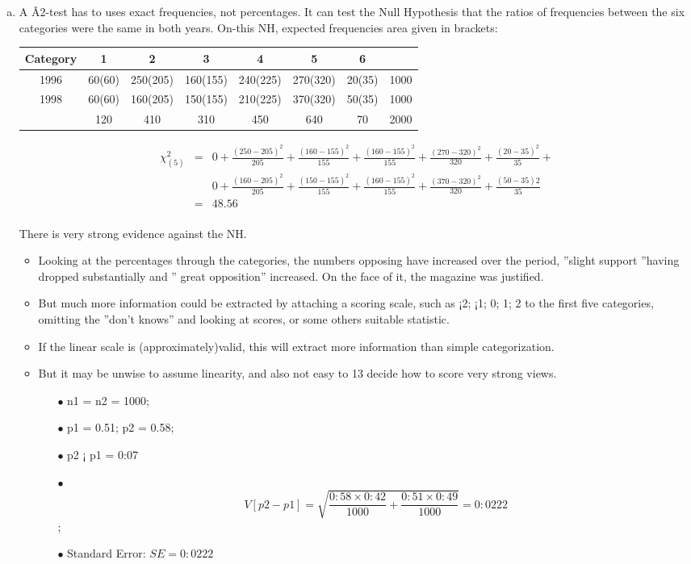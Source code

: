 \documentclass[a4paper,12pt]{article}
\begin{document}
\begin{enumerate}[(a)]
\item A Â2-test has to uses exact frequencies, not percentages. It can test the Null Hypothesis
that the ratios of frequencies between the six categories were the same in both years. On-this
NH, expected frequencies area given in brackets:

\begin{center}
\begin{tabular}{|c|c|c|c|c|c|c|c}
Category & 1 & 2 & 3 & 4 & 5 & 6 \\ \hline 
1996 & 60(60) & 250(205)  &160(155)& 240(225) & 270(320)& 20(35)& 1000\\ \hline
1998 & 60(60) & 160(205) & 150(155) & 210(225) & 370(320)&  50(35) & 1000\\ \hline
& 120&  410 & 310&  450&  640 & 70&  2000\\ \hline
\end{tabular}
\end{center}

\begin{eqnarray*}
\chi^2_{(5)} &=& 0 +  \frac{(250-205)^2}{205}  + \frac{(160-155)^2}{155} + \frac{(160-155)^2}{155}  +\frac{(270-320)^2}{320} + \frac{(20-35)^2}{35} + \\
& & 0 + \frac{(160-205)^2}{205} + \frac{(150-155)^2}{155}  + \frac{(160-155)^2}{155}+  \frac{(370-320)^2}{320} +
 \frac{(50-35)2}{35} \\
&=& 48.56\\
\end{eqnarray*}

There is very strong evidence against the NH.

\begin{itemize}
\item Looking at the percentages through the categories, the numbers opposing have increased over
the period, ”slight support ”having dropped substantially and ” great opposition” increased.
On the face of it, the magazine was justified.
\item But much more information could be extracted by attaching a scoring scale, such as ¡2; ¡1; 0;
1; 2 to the first five categories, omitting the ”don’t knows” and looking at scores, or some others
suitable statistic. 
\item If the linear scale is (approximately)valid, this will extract more information
than simple categorization. 
\item But it may be unwise to assume linearity, and also not easy to
13
decide how to score very strong views.
\begin{itemize}
\item[$\bullet$] n1 = n2 = 1000; 
\item[$\bullet$]  p1 = 0.51; p2 = 0.58; 
\item[$\bullet$]  p2 ¡ p1 = 0:07
\item[$\bullet$] \[
V [p2 - p1] =
\sqrt{\frac{0:58 \times 0:42}{1000}
+
\frac{0:51 \times 0:49}{1000}
} = 0:0222\]; 
\item[$\bullet$] Standard Error: $SE = 0:0222$
\end{itemize}


\end{itemize}
\end{enumerate}
\end{document}
